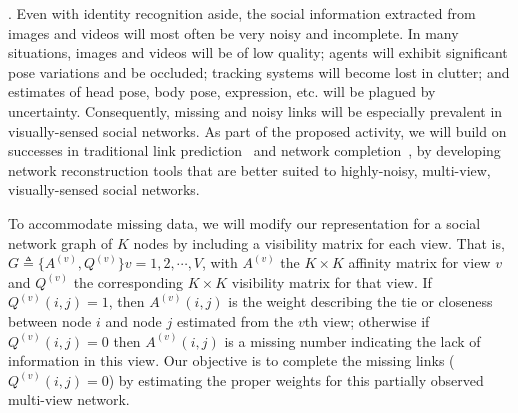 
\label{sec:reconstruct}

. Even with identity recognition aside, the social information extracted from images and videos will most often be very noisy and incomplete. In many situations, images and videos will be of low quality; agents will exhibit significant pose variations and be occluded; tracking systems will become lost in clutter; and estimates of head pose, body pose, expression, etc. will be plagued by uncertainty. Consequently, missing and noisy links will be especially prevalent in visually-sensed social networks. As part of the proposed activity, we will build on successes in traditional link prediction~\cite{Goldberg,Liben-Nowell,TaskarWAK03} and network completion~\cite{Clauset,Guimera,HannekeX09,KimL11}, by developing network reconstruction tools that are better suited to highly-noisy, multi-view, visually-sensed social networks.

To accommodate missing data, we will modify our representation for a social network graph of $K$ nodes by including a visibility matrix for each view. That is, $G\triangleq\{A^{(v)}, Q^{(v)}\} v=1,2,\cdots,V$, with $A^{(v)}$  the $K\times K$ affinity matrix for view $v$ and $Q^{(v)}$  the corresponding $K\times K$ visibility matrix for that view. If $Q^{(v)}(i,j)=1$, then $A^{(v)}(i,j)$ is the weight describing the tie or closeness between node $i$ and node $j$ estimated from the $v$th view; otherwise if $Q^{(v)}(i,j)=0$ then $A^{(v)}(i,j)$ is a missing number indicating the lack of information in this view. Our objective is to complete the missing links ($Q^{(v)}(i,j)=0$) by estimating the proper weights for this partially observed multi-view network. 



